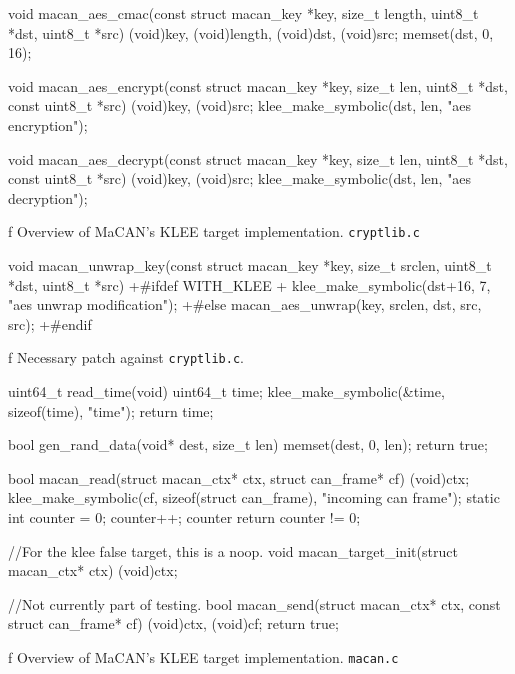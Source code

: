 \midinsert {}
\begtt
void macan_aes_cmac(const struct macan_key *key, size_t length,
                    uint8_t *dst, uint8_t *src){
    (void)key, (void)length, (void)dst, (void)src;
    memset(dst, 0, 16);
}

void macan_aes_encrypt(const struct macan_key *key, size_t len,
                       uint8_t *dst, const uint8_t *src){
    (void)key, (void)src;
    klee_make_symbolic(dst, len, "aes encryption");
}

void macan_aes_decrypt(const struct macan_key *key, size_t len,
                       uint8_t *dst, const uint8_t *src){
    (void)key, (void)src;
    klee_make_symbolic(dst, len, "aes decryption");
}

\endtt
\caption/f Overview of MaCAN's KLEE target implementation. {\tt cryptlib.c}
\endinsert

\midinsert {}
\begtt
 void macan_unwrap_key(const struct macan_key *key, size_t srclen,
                       uint8_t *dst, uint8_t *src) {
+#ifdef WITH_KLEE
+       klee_make_symbolic(dst+16, 7, "aes unwrap modification");
+#else
        macan_aes_unwrap(key, srclen, dst, src, src);
+#endif
 }
\endtt
\caption/f Necessary patch against {\tt cryptlib.c}.
\endinsert

\midinsert {}
\begtt
uint64_t read_time(void){
       uint64_t time;
       klee_make_symbolic(&time, sizeof(time), "time");
       return time;
}

bool gen_rand_data(void* dest, size_t len){
       memset(dest, 0, len);
       return true;
}

bool macan_read(struct macan_ctx* ctx, struct can_frame* cf){
       (void)ctx;
       klee_make_symbolic(cf, sizeof(struct can_frame),
                         "incoming can frame");
       static int counter = 0;
       counter++;
       counter %
       return counter != 0;
}

//For the klee false target, this is a noop.
void macan_target_init(struct macan_ctx* ctx){
       (void)ctx;
}

//Not currently part of testing.
bool macan_send(struct macan_ctx* ctx, const struct can_frame* cf){
       (void)ctx, (void)cf;
       return true;
}
\endtt
\caption/f Overview of MaCAN's KLEE target implementation. {\tt macan.c}
\endinsert



